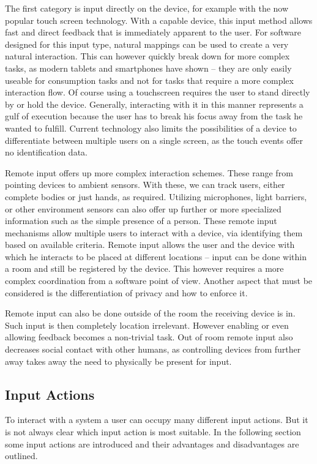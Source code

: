 \documentclass{acm_proc_article-sp}
\begin{document}
The first category is input directly on the device, for example with the now popular touch screen technology.
With a capable device, this input method allows fast and direct feedback that is immediately apparent to the user.
For software designed for this input type, natural mappings can be used to create a very natural interaction.
This can however quickly break down for more complex tasks, as modern tablets and smartphones have shown – they are only easily useable for consumption tasks and not for tasks that require a more complex interaction flow.
Of course using a touchscreen requires the user to stand directly by or hold the device.
Generally, interacting with it in this manner represents a gulf of execution because the user has to break his focus away from the task he wanted to fulfill.
Current technology also limits the possibilities of a device to differentiate between multiple users on a single screen, as the touch events offer no identification data.

Remote input offers up more complex interaction schemes.
These range from pointing devices to ambient sensors.
With these, we can track users, either complete bodies or just hands, as required. Utilizing microphones, light barriers, or other environment sensors can also offer up further or more specialized information such as the simple presence of a person.
These remote input mechanisms allow multiple users to interact with a device, via identifying them based on available criteria.
Remote input allows the user and the device with which he interacts to be placed at different locations – input can be done within a room and still be registered by the device.
This however requires a more complex coordination from a software point of view.
Another aspect that must be considered is the differentiation of privacy and how to enforce it.

Remote input can also be done outside of the room the receiving device is in.
Such input is then completely location irrelevant.
However enabling or even allowing feedback becomes a non-trivial task.
Out of room remote input also decreases social contact with other humans, as controlling devices from further away takes away the need to physically be present for input.

\subsection{Input Actions}

To interact with a system a user can occupy many different input actions.
But it is not always clear which input action is most suitable.
In the following section some input actions are introduced and their advantages and disadvantages are outlined.
\end{document}
